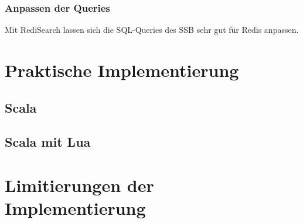 
\subsubsection{Anpassen der Queries}
Mit RediSearch lassen sich die SQL-Queries des \acf{SSB} sehr gut für Redis anpassen.
\section{Praktische Implementierung}

\subsection{Scala}

\subsection{Scala mit Lua}

\section{Limitierungen der Implementierung}
